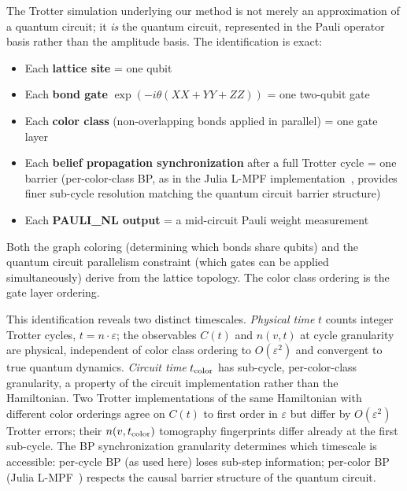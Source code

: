 \documentclass[11pt]{article}
\begin{document}
The Trotter simulation underlying our method is not merely an approximation
of a quantum circuit; it \emph{is} the quantum circuit, represented in the
Pauli operator basis rather than the amplitude basis. The identification is exact:

\begin{itemize}
    \item Each \textbf{lattice site} = one qubit
    \item Each \textbf{bond gate} $\exp(-i\theta(XX+YY+ZZ))$ = one two-qubit gate
    \item Each \textbf{color class} (non-overlapping bonds applied in parallel) = one gate layer
    \item Each \textbf{belief propagation synchronization} after a full Trotter cycle = one barrier
    (per-color-class BP, as in the Julia L-MPF implementation~\cite{robertson2026lindblad},
    provides finer sub-cycle resolution matching the quantum circuit barrier structure)
    \item Each \textbf{PAULI\_NL output} = a mid-circuit Pauli weight measurement
\end{itemize}

Both the graph coloring (determining which bonds share qubits) and the quantum
circuit parallelism constraint (which gates can be applied simultaneously) derive
from the lattice topology. The color class ordering is the gate layer ordering.

This identification reveals two distinct timescales. \textit{Physical time}
$t$ counts integer Trotter cycles, $t = n \cdot \varepsilon$; the observables
$C(t)$ and $n(v,t)$ at cycle granularity are physical, independent of color
class ordering to $O(\varepsilon^2)$ and convergent to true quantum dynamics.
\textit{Circuit time} $t_{\rm color}$ has sub-cycle, per-color-class granularity,
a property of the circuit implementation rather than the Hamiltonian. Two Trotter
implementations of the same Hamiltonian with different color orderings agree on
$C(t)$ to first order in $\varepsilon$ but differ by $O(\varepsilon^2)$ Trotter
errors; their $n(v, t_{\rm color})$ tomography fingerprints differ already at the
first sub-cycle. The BP synchronization granularity determines which timescale is
accessible: per-cycle BP (as used here) loses sub-step information; per-color BP
(Julia L-MPF~\cite{robertson2026lindblad}) respects the causal barrier structure
of the quantum circuit.
\end{document}
